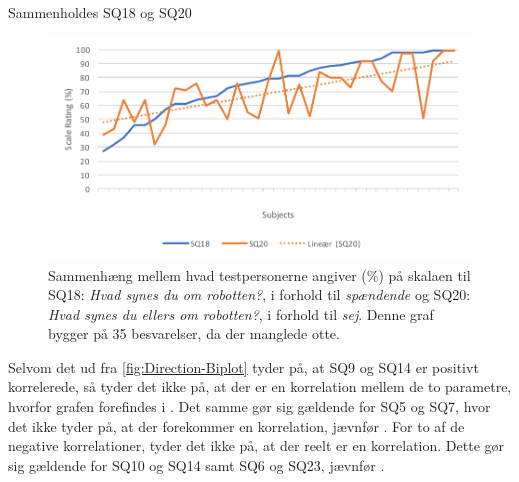 \noindent
%
Sammenholdes SQ18 og SQ20
%
\begin{figure}[H]
	\centering
	\includegraphics[width=\textwidth]{Figure/Korrelationsgrafer/SQ18+SQ20}
	\caption{Sammenhæng mellem hvad testpersonerne angiver (\%) på skalaen til SQ18: \textit{Hvad synes du om robotten?}, i forhold til \textit{spændende} og SQ20: \textit{Hvad synes du ellers om robotten?}, i forhold til \textit{sej}. Denne graf bygger på 35 besvarelser, da der manglede otte.}
	\label{fig:SammenligningSQ18SQ20}
\end{figure}
\noindent
%
Selvom det ud fra \autoref{fig:Direction-Biplot} tyder på, at SQ9 og SQ14 er positivt korrelerede, så tyder det ikke på, at der er en korrelation mellem de to parametre, hvorfor grafen forefindes i . Det samme gør sig gældende for SQ5 og SQ7, hvor det ikke tyder på, at der forekommer en korrelation, jævnfør . For to af de negative korrelationer, tyder det ikke på, at der reelt er en korrelation. Dette gør sig gældende for SQ10 og SQ14 samt SQ6 og SQ23, jævnfør .

